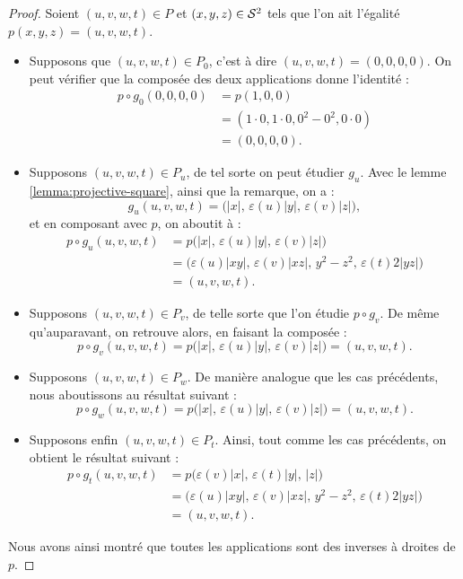 \documentclass[hidelinks, 10pt]{article}
\begin{document}
\begin{proof}
Soient $(u,v,w,t)\in P$ et $(x,y,z)\in\mathcal{S}^{2}$ tels que l'on ait l'égalité~$p(x,y,z)=(u,v,w,t)$.\begin{itemize}
    \item Supposons que $(u,v,w,t)\in P_0$, c'est à dire $(u,v,w,t)=(0,0,0,0)$. On peut vérifier que la composée des deux applications donne l'identité : \[\begin{split}
        p\circ g_0(0,0,0,0)&=p(1,0,0)\\
        &=(1\cdot0,1\cdot0,0^2-0^2,0\cdot0)\\
        &=(0,0,0,0).
    \end{split}\]
    \item Supposons $(u,v,w,t)\in P_u$, de tel sorte on peut étudier $g_u$. Avec le lemme \ref{lemma:projective-square}, ainsi que la remarque, on a : \[g_u(u,v,w,t)=\big(|x|,\,\varepsilon(u)|y|,\,\varepsilon(v)|z|\big),\]et en composant avec $p$, on aboutit à : \[\begin{split}
    p\circ g_u(u,v,w,t)&=p\big(|x|,\,\varepsilon(u)|y|,\,\varepsilon(v)|z|\big)\\
    &=\big(\varepsilon(u)|xy|,\,\varepsilon(v)|xz|,\, y^2-z^2,\,\varepsilon(t)2|yz|\big)\\
    &=(u,v,w,t).
    \end{split}\]
    \item Supposons $(u,v,w,t)\in P_v$, de telle sorte que l'on étudie $p\circ g_v$. De même qu'auparavant, on retrouve alors, en faisant la composée : \[p\circ g_v(u,v,w,t)=p\big(|x|,\,\varepsilon(u)|y|,\,\varepsilon(v)|z|\big)=(u,v,w,t).\]
    \item Supposons $(u,v,w,t)\in P_w$. De manière analogue que les cas précédents, nous aboutissons au résultat suivant : 
    \[p\circ g_w(u,v,w,t)=p\big(|x|,\,\varepsilon(u)|y|,\,\varepsilon(v)|z|\big)=(u,v,w,t).\]
    \item Supposons enfin $(u,v,w,t)\in P_t$. Ainsi, tout comme les cas précédents, on obtient le résultat suivant : \[\begin{split}
    p\circ g_t(u,v,w,t)&=p\big(\varepsilon(v)|x|,\,\varepsilon(t)|y|,\,|z|\big)\\
    &=\big(\varepsilon(u)|xy|,\,\varepsilon(v)|xz|,\, y^2-z^2,\,\varepsilon(t)2|yz|\big)\\
    &=(u,v,w,t).
    \end{split}\]
\end{itemize}
Nous avons ainsi montré que toutes les applications sont des inverses à droites de $p$.
\end{proof}
\end{document}
